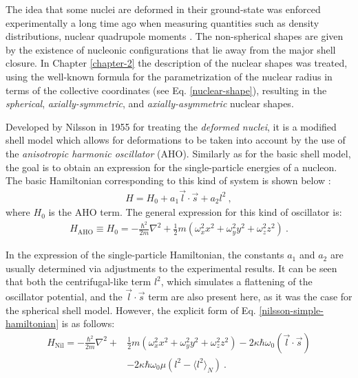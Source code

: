 The idea that some nuclei are deformed in their ground-state was enforced experimentally a long time ago when measuring quantities such as density distributions, nuclear quadrupole moments \cite{casten2000nuclear}. The non-spherical shapes are given by the existence of nucleonic configurations that lie away from the major shell closure. In Chapter \ref{chapter-2} the description of the nuclear shapes was treated, using the well-known formula for the parametrization of the nuclear radius in terms of the collective coordinates (see Eq. \ref{nuclear-shape}), resulting in the \emph{spherical}, \emph{axially-symmetric}, and \emph{axially-asymmetric} nuclear shapes.

Developed by Nilsson in 1955 \cite{nilsson1955binding} for treating the \emph{deformed nuclei}, it is a modified shell model which allows for deformations to be taken into account by the use of the \emph{anisotropic harmonic oscillator} (AHO). Similarly as for the basic shell model, the goal is to obtain an expression for the single-particle energies of a nucleon. The basic Hamiltonian corresponding to this kind of system is shown below \cite{bertulani2007nuclear}:
\begin{align}
    H=H_0+a_1\vec{l}\cdot\vec{s}+a_2l^2\ ,
    \label{nilsson-simple-hamiltonian}
\end{align}
where $H_0$ is the AHO term. The general expression for this kind of oscillator is:
\begin{align}
    H_\text{AHO}\equiv H_0=-\frac{\hbar^2}{2m}\nabla^2+\frac{1}{2}m(\omega_x^2x^2+\omega_y^2y^2+\omega_z^2z^2)\ .
\end{align}

In the expression of the single-particle Hamiltonian, the constants $a_1$ and $a_2$ are usually determined via adjustments to the experimental results. It can be seen that both the centrifugal-like term $l^2$, which simulates a flattening of the oscillator potential, and the $\vec{l}\cdot\vec{s}$ term are also present here, as it was the case for the spherical shell model. However, the explicit form of Eq. \ref{nilsson-simple-hamiltonian} is as follows:
\begin{align}
    H_\text{Nil}=-\frac{\hbar^2}{2m}\nabla^2+&\frac{1}{2}m(\omega_x^2x^2+\omega_y^2y^2+\omega_z^2z^2)-2\kappa\hbar\omega_0(\vec{l}\cdot\vec{s})\nonumber\\&-2\kappa\hbar\omega_0\mu\left(l^2-\langle l^2\rangle_N\right)\ .
    \label{eq-full-nilsson-ham}
\end{align}

